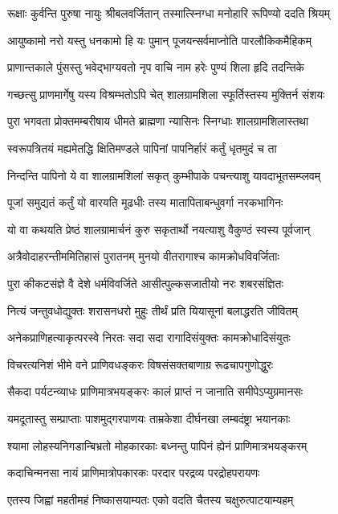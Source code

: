 \twolineshloka
{रूक्षाः कुर्वन्ति पुरुषा नायुः श्रीबलवर्जितान्}
{तस्मात्स्निग्धा मनोहारि रूपिण्यो ददति श्रियम्}%

\twolineshloka
{आयुष्कामो नरो यस्तु धनकामो हि यः पुमान्}
{पूजयन्सर्वमाप्नोति पारलौकिकमैहिकम्}%

\twolineshloka
{प्राणान्तकाले पुंसस्तु भवेद्भाग्यवतो नृप}
{वाचि नाम हरेः पुण्यं शिला हृदि तदन्तिके}%

\twolineshloka
{गच्छत्सु प्राणमार्गेषु यस्य विश्रम्भतोऽपि चेत्}
{शालग्रामशिला स्फूर्तिस्तस्य मुक्तिर्न संशयः}%

\twolineshloka
{पुरा भगवता प्रोक्तमम्बरीषाय धीमते}
{ब्राह्मणा न्यासिनः स्निग्धाः शालग्रामशिलास्तथा}%

\twolineshloka
{स्वरूपत्रितयं मह्यमेतद्धि क्षितिमण्डले}
{पापिनां पापनिर्हारं कर्तुं धृतमुदं च ता}%

\twolineshloka
{निन्दन्ति पापिनो ये वा शालग्रामशिलां सकृत्}
{कुम्भीपाके पचन्त्याशु यावदाभूतसम्प्लवम्}%

\twolineshloka
{पूजां समुद्यतं कर्तुं यो वारयति मूढधीः}
{तस्य मातापिताबन्धुवर्गा नरकभागिनः}%

\twolineshloka
{यो वा कथयति प्रेष्ठं शालग्रामार्चनं कुरु}
{सकृतार्थो नयत्याशु वैकुण्ठं स्वस्य पूर्वजान्}%

\twolineshloka
{अत्रैवोदाहरन्तीममितिहासं पुरातनम्}
{मुनयो वीतरागाश्च कामक्रोधविवर्जिताः}%

\twolineshloka
{पुरा कीकटसंज्ञे वै देशे धर्मविवर्जिते}
{आसीत्पुल्कसजातीयो नरः शबरसंज्ञितः}%

\twolineshloka
{नित्यं जन्तुवधोद्युक्तः शरासनधरो मुहुः}
{तीर्थं प्रति यियासूनां बलाद्धरति जीवितम्}%

\twolineshloka
{अनेकप्राणिहत्याकृत्परस्वे निरतः सदा}
{सदा रागादिसंयुक्तः कामक्रोधादिसंयुतः}%

\twolineshloka
{विचरत्यनिशं भीमे वने प्राणिवधङ्करः}
{विषसंसक्तबाणाग्र रूढचापगुणोद्धुरः}%

\twolineshloka
{सैकदा पर्यटन्व्याधः प्राणिमात्रभयङ्करः}
{कालं प्राप्तं न जानाति समीपेऽप्युग्रमानसः}%

\twolineshloka
{यमदूतास्तु सम्प्राप्ताः पाशमुद्गरपाणयः}
{ताम्रकेशा दीर्घनखा लम्बदंष्ट्रा भयानकाः}%

\twolineshloka
{श्यामा लोहस्यनिगडान्बिभ्रतो मोहकारकाः}
{बध्नन्तु पापिनं ह्येनं प्राणिमात्रभयङ्करम्}%

\twolineshloka
{कदाचिन्मनसा नायं प्राणिमात्रोपकारकः}
{परदार परद्रव्य परद्रोहपरायणः}%

\twolineshloka
{एतस्य जिह्वां महतीमहं निष्कासयाम्यतः}
{एको वदति चैतस्य चक्षुरुत्पाटयाम्यहम्}%

